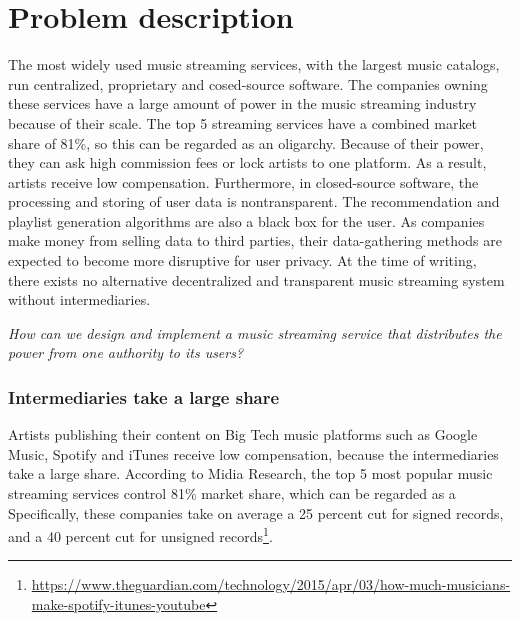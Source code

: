 \chapter{\label{chap:related-work}Problem description}
The most widely used music streaming services, with the largest music catalogs, run centralized, proprietary and cosed-source software. The companies owning these services have a large amount of power in the music streaming industry because of their scale. The top 5 streaming services have a combined market share of 81\%, so this can be regarded as an oligarchy. Because of their power, they can ask high commission fees or lock artists to one platform. As a result, artists receive low compensation. Furthermore, in closed-source software, the processing and storing of user data is nontransparent. The recommendation and playlist generation algorithms are also a black box for the user. As companies make money from selling data to third parties, their data-gathering methods are expected to become more disruptive for user privacy. At the time of writing, there exists no alternative decentralized and transparent music streaming system without intermediaries.

\textit{How can we design and implement a music streaming service that distributes the power from one authority to its users?}%
\subsection{Intermediaries take a large share}
Artists publishing their content on Big Tech music platforms such as Google Music, Spotify and iTunes receive low compensation, because the intermediaries take a large share. According to Midia Research, the top 5 most popular music streaming services control 81\% market share\cite{midiamarketshare2020}, which can be regarded as a  Specifically, these companies take on average a 25 percent cut for signed records, and a 40 percent cut for unsigned records\footnote{\url{https://www.theguardian.com/technology/2015/apr/03/how-much-musicians-make-spotify-itunes-youtube}}. 
